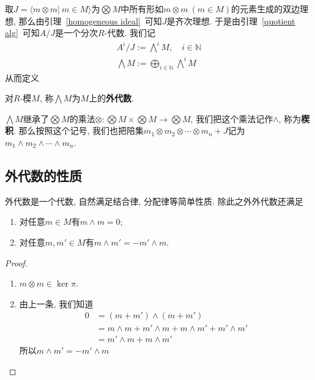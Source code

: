取$J=\langle m\otimes m|\ m\in M\rangle$为$\bigotimes M$中所有形如$m\otimes m\ (m\in M)$的元素生成的双边理想, 那么由引理~\ref{homogeneous ideal}~可知$J$是齐次理想.
于是由引理~\ref{quotient alg}~可知$A/J$是一个分次$R$-代数.
我们记
\begin{gather*}
    A^i/J:=\bigwedge\nolimits^i M,\quad i\in\mathbb{N}\\
    \bigwedge M:=\bigoplus_{i\in\mathbb{N}}\bigwedge\nolimits^i M
\end{gather*}
从而定义
\begin{defn}
    对$R$-模$M$, 称$\bigwedge M$为$M$上的\textbf{外代数}.
\end{defn}

\begin{sym}
    $\displaystyle\bigwedge M$继承了$\displaystyle\bigotimes M$的乘法$\otimes:\displaystyle\bigotimes M\times\bigotimes M\to\bigotimes M$, 我们把这个乘法记作$\wedge$, 称为\textbf{楔积}.
    那么按照这个记号, 我们也把陪集$m_1\otimes m_2\otimes\cdots\otimes m_n+J$记为$m_1\wedge m_2\wedge\cdots\wedge m_n$.
\end{sym}

\subsection*{外代数的性质}

外代数是一个代数, 自然满足结合律, 分配律等简单性质.
除此之外外代数还满足

\begin{prop}[交错性]\label{alternative}
    \begin{enumerate}[{\rm (1)}]
        \item 对任意$m\in M$有$m\wedge m=0$;
        \item 对任意$m, m'\in M$有$m\wedge m'=-m'\wedge m$.
    \end{enumerate}
\end{prop}
\begin{proof}
    \begin{enumerate}
        \item $m\otimes m\in\ker\pi$.
        \item 由上一条, 我们知道
        \begin{align*}
            0&=(m+m')\wedge(m+m')\\
            &=m\wedge m+m'\wedge m+m\wedge m'+m'\wedge m'\\
            &=m'\wedge m+m\wedge m'
        \end{align*}
        所以$m\wedge m'=-m'\wedge m$
    \end{enumerate}
\end{proof}

